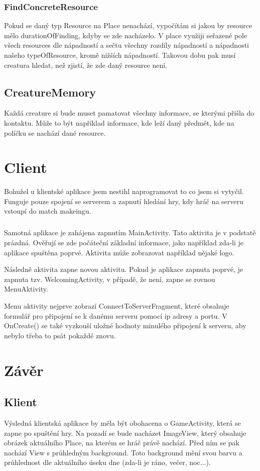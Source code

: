 \documentclass[12pt,a4paper]{report}
\begin{document}
\subsection{FindConcreteResource}
Pokud se daný typ Resource na Place nenachází, vypočítám si jakou by resource mělo durationOfFinding, kdyby se zde nacházelo. V place využiji seřazené pole všech resources dle nápadností a sečtu všechny rozdíly nápadností a nápadnosti našeho typeOfResource, kromě nižších nápadností. Takovou dobu pak musí creatura hledat, než zjistí, že zde daný resource není.

\section{CreatureMemory}
Každá creature si bude muset pamatovat všechny informace, se kterými přišla do kontaktu. Může to být například informace, kde leží daný předmět, kde na políčku se nachází dané resource.

\chapter{Client}
Bohužel u klientské aplikace jsem nestihl naprogramovat to co jsem si vytyčil. Funguje pouze spojení se serverem a zapnutí hledání hry, kdy hráč na serveru vstoupí do match makeingu. 

\paragraph{}
Samotná aplikace je zahájena zapnutím MainActivity. Tato aktivita je v podstatě prázdná. Ověřují se zde počáteční základní informace, jako například zda-li je aplikace spuštěna poprvé. Aktivita může zobrazovat například nějaké logo.

Následně aktivita zapne novou aktivitu. Pokud je aplikace zapnuta poprvé, je zapnuta tzv. WelcomingActivity, v případě, že není, zapne se rovnou MenuAktivity.

Menu aktivity nejprve zobrazí ConnectToServerFragment, které obsahuje formulář pro připojení se k danému serveru pomocí ip adresy a portu. V OnCreate() se také vyzkouší uložné hodnoty minulého připojení k serveru, aby nebylo třeba to psát pokaždé znovu.

\chapter{Závěr}
\section{Klient}
Výsledná klientská aplikace by měla být obohacena o GameActivity, která se zapne po spuštění hry. Na pozadí se bude nacházet ImageView, který obsahuje obrázek aktuálního Place, na kterém se hráč právě nachází. Před ním se pak nachází View s průhledným background. Toto background mění svou barvu a průhlednost dle aktuálního úseku dne (zda-li je ráno, večer, noc...). 
\end{document}
